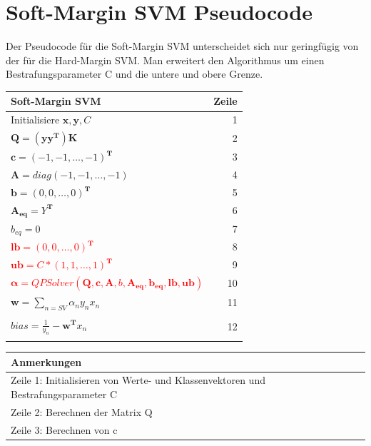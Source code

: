 \documentclass[a4paper,11pt,twoside]{scrreprt}
\begin{document}
\section{Soft-Margin SVM Pseudocode}\label{sec:smsvmpseudo}
Der Pseudocode für die Soft-Margin SVM unterscheidet sich nur geringfügig von der für die Hard-Margin SVM.
Man erweitert den Algorithmus um einen Bestrafungsparameter C und die untere und obere Grenze.
\begin{table}[H]\label{tab:smpc}
\begin{tabular}{|l r|}
    \hline
    \textbf{Soft-Margin SVM} & \textbf{Zeile} \\
    \hline
    Initialisiere $\mathbf{x}, \mathbf{y}, C$ & 1\\
    $\mathbf{Q} = (\mathbf{y}\mathbf{y}^{\mathbf{T}})\mathbf{K}$ & 2\\
    $\mathbf{c} = \left( -1, -1, \ldots, -1 \right)^{\mathbf{T}}$ & 3 \\
    $\mathbf{A} = diag\left( -1, -1, \ldots, -1 \right)$ & 4 \\
    $\mathbf{b} = \left( 0, 0, \ldots, 0 \right)^{\mathbf{T}}$ & 5\\
    $\mathbf{A_{eq}} = Y^{\mathbf{T}}$ & 6\\
    $b_{eq} = 0$ & 7\\
    \textcolor{red}{$\mathbf{lb} = \left( 0, 0, \ldots, 0 \right)^{\mathbf{T}}$} & 8 \\
    \textcolor{red}{$\mathbf{ub} = C * \left( 1, 1, \ldots, 1 \right)^{\mathbf{T}}$} & 9 \\
    \textcolor{red}{$\mathbf{\alpha} = QPSolver\left( \mathbf{Q}, \mathbf{c}, \mathbf{A}, b, \mathbf{A_{eq}}, \mathbf{b_{eq}}, \mathbf{lb}, \mathbf{ub} \right)$} & 10\\
    $\mathbf{w} = \sum\limits_{n=SV} \alpha_{n} y_{n} x_{n}$  & 11\\
    & \\[-1em]
    $bias = \frac{1}{y_{n}} - \mathbf{w}^{\mathbf{T}}x_{n}$ & 12\\
    & \\
    \hline
\end{tabular}
\begin{tabular}{|l|}
    \hline
    \textbf{Anmerkungen} \\
    \hline
    Zeile 1: Initialisieren von Werte- und Klassenvektoren und Bestrafungsparameter C\\
    Zeile 2: Berechnen der Matrix Q \\
    Zeile 3: Berechnen von c \\

\end{tabular}
\end{table}
\end{document}
